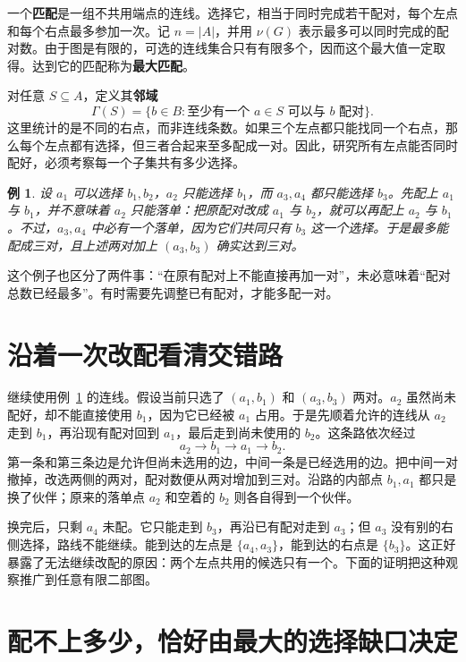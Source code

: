 \documentclass[UTF8,a4paper,oneside,openany,fontset=fandol,zihao=-4]{ctexbook}
\theoremstyle{guide}
\newtheorem{example}[theorem]{例}
\begin{document}
一个\textbf{匹配}是一组不共用端点的连线。选择它，相当于同时完成若干配对，每个左点和每个右点最多参加一次。记 $n=|A|$，并用 $\nu(G)$ 表示最多可以同时完成的配对数。由于图是有限的，可选的连线集合只有有限多个，因而这个最大值一定取得。达到它的匹配称为\textbf{最大匹配}。

对任意 $S\subseteq A$，定义其\textbf{邻域}
\[
\Gamma(S)=\{b\in B:\text{至少有一个 }a\in S\text{ 可以与 }b\text{ 配对}\}.
\]
这里统计的是不同的右点，而非连线条数。如果三个左点都只能找同一个右点，那么每个左点都有选择，但三者合起来至多配成一对。因此，研究所有左点能否同时配好，必须考察每一个子集共有多少选择。

\begin{example}\label{mat:example-conflict}
设 $a_1$ 可以选择 $b_1,b_2$，$a_2$ 只能选择 $b_1$，而 $a_3,a_4$ 都只能选择 $b_3$。先配上 $a_1$ 与 $b_1$，并不意味着 $a_2$ 只能落单：把原配对改成 $a_1$ 与 $b_2$，就可以再配上 $a_2$ 与 $b_1$。不过，$a_3,a_4$ 中必有一个落单，因为它们共同只有 $b_3$ 这一个选择。于是最多能配成三对，且上述两对加上 $(a_3,b_3)$ 确实达到三对。
\end{example}

这个例子也区分了两件事：“在原有配对上不能直接再加一对”，未必意味着“配对总数已经最多”。有时需要先调整已有配对，才能多配一对。

\section{沿着一次改配看清交错路}

继续使用例~\ref{mat:example-conflict} 的连线。假设当前只选了 $(a_1,b_1)$ 和 $(a_3,b_3)$ 两对。$a_2$ 虽然尚未配好，却不能直接使用 $b_1$，因为它已经被 $a_1$ 占用。于是先顺着允许的连线从 $a_2$ 走到 $b_1$，再沿现有配对回到 $a_1$，最后走到尚未使用的 $b_2$。这条路依次经过
\[
a_2\longrightarrow b_1\longrightarrow a_1\longrightarrow b_2.
\]
第一条和第三条边是允许但尚未选用的边，中间一条是已经选用的边。把中间一对撤掉，改选两侧的两对，配对数便从两对增加到三对。沿路的内部点 $b_1,a_1$ 都只是换了伙伴；原来的落单点 $a_2$ 和空着的 $b_2$ 则各自得到一个伙伴。

换完后，只剩 $a_4$ 未配。它只能走到 $b_3$，再沿已有配对走到 $a_3$；但 $a_3$ 没有别的右侧选择，路线不能继续。能到达的左点是 $\{a_4,a_3\}$，能到达的右点是 $\{b_3\}$。这正好暴露了无法继续改配的原因：两个左点共用的候选只有一个。下面的证明把这种观察推广到任意有限二部图。

\section{配不上多少，恰好由最大的选择缺口决定}
\end{document}
